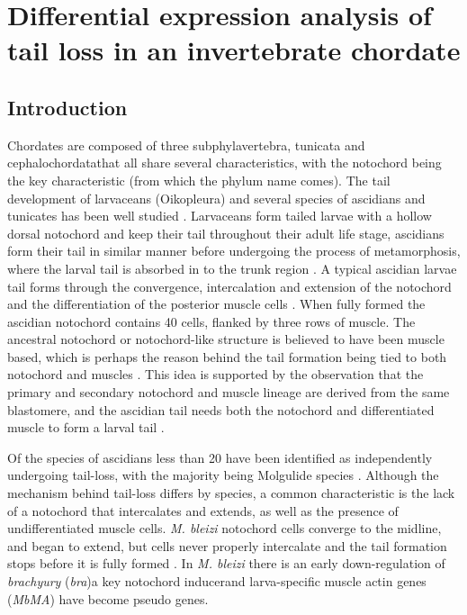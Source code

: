 \chapter{Differential expression analysis of tail loss in an invertebrate chordate}

\section{Introduction}

Chordates are composed of three subphyla\textemdash vertebra, tunicata and cephalochordata\textemdash that all share several characteristics, with the notochord being the key characteristic (from which the phylum name comes). The tail development of larvaceans (Oikopleura) and several species of ascidians and tunicates has been well studied \cite{jeffery_factors_1992,nakatani_mutations_1999,kugler_evolutionary_2011}. Larvaceans form tailed larvae with a hollow dorsal notochord and keep their tail throughout their adult life stage, ascidians form their tail in similar manner before undergoing the process of metamorphosis, where the larval tail is absorbed in to the trunk region \cite{paris_history_2008}. A typical ascidian larvae tail forms through the convergence, intercalation and extension of the notochord and the differentiation of the posterior muscle cells \cite{swalla_mechanisms_1993}. When fully formed the ascidian notochord contains 40 cells, flanked by three rows of muscle. The ancestral notochord or notochord-like structure is believed to have been muscle based, which is perhaps the reason behind the tail formation being tied to both notochord and muscles \cite{lauri_development_2014}. This idea is supported by the observation that the primary and secondary notochord and muscle lineage are derived from the same blastomere, and the ascidian tail needs both the notochord and differentiated muscle to form a larval tail \cite{nishida_cell_1987,di_gregorio_tail_2002}.

Of the  species of ascidians less than 20 have been identified as independently undergoing tail-loss, with the majority being Molgulide species \cite{berrill_studies_1931,huber_evolution_2000}. Although the mechanism behind tail-loss differs by species, a common characteristic is the lack of a notochord that intercalates and extends, as well as the presence of undifferentiated muscle cells\cite{swalla_mechanisms_1993}. \textit{M. bleizi} notochord cells converge to the midline, and began to extend, but cells never properly intercalate and the tail formation stops before it is fully formed \cite{jeffery_evolution_1999}. In \textit{M. bleizi} there is an early down-regulation of \textit{brachyury} (\textit{bra})\textemdash a key notochord inducer\textemdash and larva-specific muscle actin genes (\textit{MbMA}) have become pseudo genes.   

